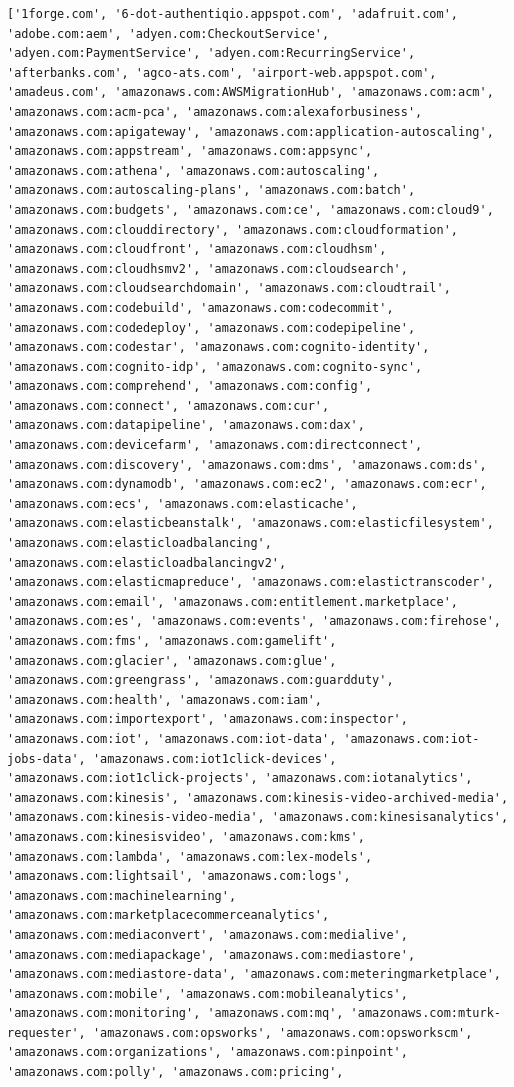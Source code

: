 \documentclass[11pt]{article}
\begin{document}
    \begin{Verbatim}[commandchars=\\\{\}]
['1forge.com', '6-dot-authentiqio.appspot.com', 'adafruit.com', 'adobe.com:aem', 'adyen.com:CheckoutService', 'adyen.com:PaymentService', 'adyen.com:RecurringService', 'afterbanks.com', 'agco-ats.com', 'airport-web.appspot.com', 'amadeus.com', 'amazonaws.com:AWSMigrationHub', 'amazonaws.com:acm', 'amazonaws.com:acm-pca', 'amazonaws.com:alexaforbusiness', 'amazonaws.com:apigateway', 'amazonaws.com:application-autoscaling', 'amazonaws.com:appstream', 'amazonaws.com:appsync', 'amazonaws.com:athena', 'amazonaws.com:autoscaling', 'amazonaws.com:autoscaling-plans', 'amazonaws.com:batch', 'amazonaws.com:budgets', 'amazonaws.com:ce', 'amazonaws.com:cloud9', 'amazonaws.com:clouddirectory', 'amazonaws.com:cloudformation', 'amazonaws.com:cloudfront', 'amazonaws.com:cloudhsm', 'amazonaws.com:cloudhsmv2', 'amazonaws.com:cloudsearch', 'amazonaws.com:cloudsearchdomain', 'amazonaws.com:cloudtrail', 'amazonaws.com:codebuild', 'amazonaws.com:codecommit', 'amazonaws.com:codedeploy', 'amazonaws.com:codepipeline', 'amazonaws.com:codestar', 'amazonaws.com:cognito-identity', 'amazonaws.com:cognito-idp', 'amazonaws.com:cognito-sync', 'amazonaws.com:comprehend', 'amazonaws.com:config', 'amazonaws.com:connect', 'amazonaws.com:cur', 'amazonaws.com:datapipeline', 'amazonaws.com:dax', 'amazonaws.com:devicefarm', 'amazonaws.com:directconnect', 'amazonaws.com:discovery', 'amazonaws.com:dms', 'amazonaws.com:ds', 'amazonaws.com:dynamodb', 'amazonaws.com:ec2', 'amazonaws.com:ecr', 'amazonaws.com:ecs', 'amazonaws.com:elasticache', 'amazonaws.com:elasticbeanstalk', 'amazonaws.com:elasticfilesystem', 'amazonaws.com:elasticloadbalancing', 'amazonaws.com:elasticloadbalancingv2', 'amazonaws.com:elasticmapreduce', 'amazonaws.com:elastictranscoder', 'amazonaws.com:email', 'amazonaws.com:entitlement.marketplace', 'amazonaws.com:es', 'amazonaws.com:events', 'amazonaws.com:firehose', 'amazonaws.com:fms', 'amazonaws.com:gamelift', 'amazonaws.com:glacier', 'amazonaws.com:glue', 'amazonaws.com:greengrass', 'amazonaws.com:guardduty', 'amazonaws.com:health', 'amazonaws.com:iam', 'amazonaws.com:importexport', 'amazonaws.com:inspector', 'amazonaws.com:iot', 'amazonaws.com:iot-data', 'amazonaws.com:iot-jobs-data', 'amazonaws.com:iot1click-devices', 'amazonaws.com:iot1click-projects', 'amazonaws.com:iotanalytics', 'amazonaws.com:kinesis', 'amazonaws.com:kinesis-video-archived-media', 'amazonaws.com:kinesis-video-media', 'amazonaws.com:kinesisanalytics', 'amazonaws.com:kinesisvideo', 'amazonaws.com:kms', 'amazonaws.com:lambda', 'amazonaws.com:lex-models', 'amazonaws.com:lightsail', 'amazonaws.com:logs', 'amazonaws.com:machinelearning', 'amazonaws.com:marketplacecommerceanalytics', 'amazonaws.com:mediaconvert', 'amazonaws.com:medialive', 'amazonaws.com:mediapackage', 'amazonaws.com:mediastore', 'amazonaws.com:mediastore-data', 'amazonaws.com:meteringmarketplace', 'amazonaws.com:mobile', 'amazonaws.com:mobileanalytics', 'amazonaws.com:monitoring', 'amazonaws.com:mq', 'amazonaws.com:mturk-requester', 'amazonaws.com:opsworks', 'amazonaws.com:opsworkscm', 'amazonaws.com:organizations', 'amazonaws.com:pinpoint', 'amazonaws.com:polly', 'amazonaws.com:pricing', 
\end{Verbatim}
\end{document}
